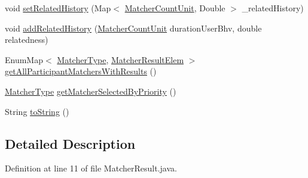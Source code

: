 \begin{DoxyCompactItemize}
\item 
void \hyperlink{classlab_1_1davidahn_1_1appshuttle_1_1predict_1_1matcher_1_1_matcher_result_a4bfbdf5925e9cbf13518a3c11f4336fc}{set\-Related\-History} (\-Map$<$ \hyperlink{classlab_1_1davidahn_1_1appshuttle_1_1predict_1_1matcher_1_1_matcher_count_unit}{\-Matcher\-Count\-Unit}, \-Double $>$ \-\_\-related\-History)
\item 
void \hyperlink{classlab_1_1davidahn_1_1appshuttle_1_1predict_1_1matcher_1_1_matcher_result_a413b26ae45c061ba9314af946740cc67}{add\-Related\-History} (\hyperlink{classlab_1_1davidahn_1_1appshuttle_1_1predict_1_1matcher_1_1_matcher_count_unit}{\-Matcher\-Count\-Unit} duration\-User\-Bhv, double relatedness)
\item 
\-Enum\-Map$<$ \hyperlink{enumlab_1_1davidahn_1_1appshuttle_1_1predict_1_1matcher_1_1_matcher_type}{\-Matcher\-Type}, \*
\hyperlink{classlab_1_1davidahn_1_1appshuttle_1_1predict_1_1matcher_1_1_matcher_result_elem}{\-Matcher\-Result\-Elem} $>$ \hyperlink{classlab_1_1davidahn_1_1appshuttle_1_1predict_1_1matcher_1_1_matcher_result_aa062ff21af33bc21d956b51fe77204de}{get\-All\-Participant\-Matchers\-With\-Results} ()
\item 
\hyperlink{enumlab_1_1davidahn_1_1appshuttle_1_1predict_1_1matcher_1_1_matcher_type}{\-Matcher\-Type} \hyperlink{classlab_1_1davidahn_1_1appshuttle_1_1predict_1_1matcher_1_1_matcher_result_af207b7f19eed50693f781b2ecb244a0d}{get\-Matcher\-Selected\-By\-Priority} ()
\item 
\-String \hyperlink{classlab_1_1davidahn_1_1appshuttle_1_1predict_1_1matcher_1_1_matcher_result_a96ea101c57f67079355ffda5ae4f17c2}{to\-String} ()
\end{DoxyCompactItemize}


\subsection{\-Detailed \-Description}


\-Definition at line 11 of file \-Matcher\-Result.\-java.



